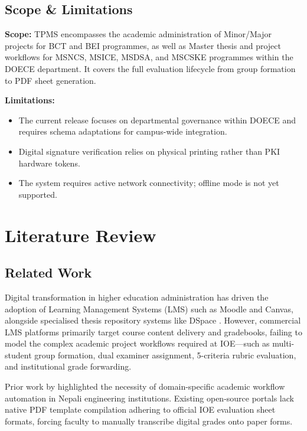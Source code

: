 \documentclass[12pt]{report}
\begin{document}
\section{Scope \& Limitations}
\textbf{Scope:} TPMS encompasses the academic administration of Minor/Major projects
for BCT and BEI programmes, as well as Master thesis and project workflows for MSNCS,
MSICE, MSDSA, and MSCSKE programmes within the DOECE department. It covers the full
evaluation lifecycle from group formation to PDF sheet generation.

\textbf{Limitations:}
\begin{itemize}[leftmargin=1.5cm]
    \item The current release focuses on departmental governance within DOECE and
          requires schema adaptations for campus-wide integration.
    \item Digital signature verification relies on physical printing rather than
          PKI hardware tokens.
    \item The system requires active network connectivity; offline mode is not yet
          supported.
\end{itemize}

\chapter{Literature Review}

\section{Related Work}
Digital transformation in higher education administration has driven the adoption of
Learning Management Systems (LMS) such as Moodle and Canvas, alongside specialised
thesis repository systems like DSpace \citep{lewis2020retrieval}. However, commercial
LMS platforms primarily target course content delivery and gradebooks, failing to model
the complex academic project workflows required at IOE---such as multi-student group
formation, dual examiner assignment, 5-criteria rubric evaluation, and institutional
grade forwarding.

Prior work by \citet{giri2019transfer} highlighted the necessity of domain-specific
academic workflow automation in Nepali engineering institutions. Existing open-source
portals lack native PDF template compilation adhering to official IOE evaluation sheet
formats, forcing faculty to manually transcribe digital grades onto paper forms.
\end{document}
